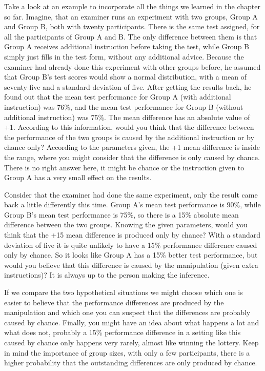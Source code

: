 \documentclass[
]{book}
\begin{document}
Take a look at an example to incorporate all the things we learned in the chapter so far. Imagine, that an examiner runs an experiment with two groups, Group A and Group B, both with twenty participants. There is the same test assigned, for all the participants of Group A and B. The only difference between them is that Group A receives additional instruction before taking the test, while Group B simply just fills in the test form, without any additional advice. Because the examiner had already done this experiment with other groups before, he assumed that Group B's test scores would show a normal distribution, with a mean of seventy-five and a standard deviation of five. After getting the results back, he found out that the mean test performance for Group A (with additional instruction) was 76\%, and the mean test performance for Group B (without additional instruction) was 75\%. The mean difference has an absolute value of +1. According to this information, would you think that the difference between the performance of the two groups is caused by the additional instruction or by chance only? According to the parameters given, the +1 mean difference is inside the range, where you might consider that the difference is only caused by chance. There is no right answer here, it might be chance or the instruction given to Group A has a very small effect on the results.

Consider that the examiner had done the same experiment, only the result came back a little differently this time. Group A's mean test performance is 90\%, while Group B's mean test performance is 75\%, so there is a 15\% absolute mean difference between the two groups. Knowing the given parameters, would you think that the +15 mean difference is produced only by chance? With a standard deviation of five it is quite unlikely to have a 15\% performance difference caused only by chance. So it looks like Group A has a 15\% better test performance, but would you believe that this difference is caused by the manipulation (given extra instructions)? It is always up to the person making the inference.

If we compare the two hypothetical situations we might choose which one is easier to believe that the performance differences are produced by the manipulation and which one you can suspect that the differences are probably caused by chance. Finally, you might have an idea about what happens a lot and what does not, probably a 15\% performance difference in a setting like this caused by chance only happens very rarely, almost like winning the lottery. Keep in mind the importance of group sizes, with only a few participants, there is a higher probability that the outstanding differences are only produced by chance.
\end{document}
